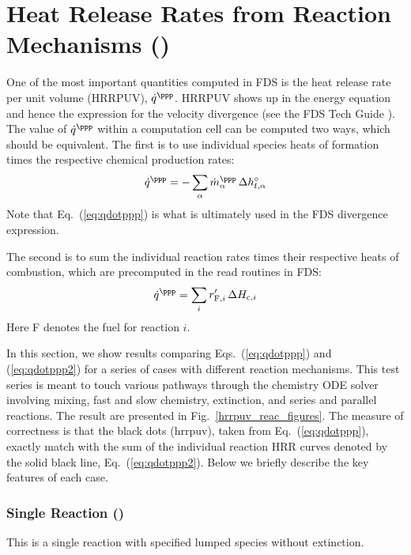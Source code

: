 \documentclass[11pt]{book}
\begin{document}
\section{Heat Release Rates from Reaction Mechanisms ()}
\label{hrrpuv_reac}
\label{hrrpuv_reac_arrhenius}
\label{hrrpuv_reac_extinction}
\label{hrrpuv_reac_parallel}
\label{hrrpuv_reac_parallel_2}
\label{hrrpuv_reac_series}
\label{hrrpuv_reac_simple}
\label{hrrpuv_reac_single}
\label{hrrpuv_reac_soot}

One of the most important quantities computed in FDS is the heat release rate per unit volume (HRRPUV), $\dot{q}^{\ppp}$.  HRRPUV shows up in the energy equation and hence the expression for the velocity divergence (see the FDS Tech Guide \cite{FDS_Math_Guide}).  The value of $\dot{q}^{\ppp}$ within a computation cell can be computed two ways, which should be equivalent.  The first is to use individual species heats of formation times the respective chemical production rates:
\begin{equation}
\label{eq:qdotppp}
\dot{q}^{\ppp} = - \sum_\alpha \dot{m}_\alpha^{\ppp} \, \Delta h_{{\rm f},\alpha}^\circ
\end{equation}
Note that Eq.~(\ref{eq:qdotppp}) is what is ultimately used in the FDS divergence expression.

The second is to sum the individual reaction rates  times their respective heats of combustion, which are precomputed in the read routines in FDS:
\begin{equation}
\label{eq:qdotppp2}
\dot{q}^{\ppp} = \sum_i r_{{\rm F},i}^\prime \, \Delta H_{{\rm c},i}
\end{equation}
Here F denotes the fuel for reaction $i$.

In this section, we show results comparing Eqs.~(\ref{eq:qdotppp}) and (\ref{eq:qdotppp2}) for a series of cases with different reaction mechanisms.  This test series is meant to touch various pathways through the chemistry ODE solver involving mixing, fast and slow chemistry, extinction, and series and parallel reactions.  The result are presented in Fig.~\ref{hrrpuv_reac_figures}.  The measure of correctness is that the black dots (hrrpuv), taken from Eq.~(\ref{eq:qdotppp}), exactly match with the sum of the individual reaction HRR curves denoted by the solid black line, Eq.~(\ref{eq:qdotppp2}). Below we briefly describe the key features of each case.

\subsubsection{Single Reaction ()} This is a single reaction with specified lumped species without extinction.
\end{document}
